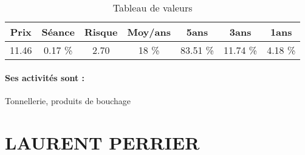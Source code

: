 \documentclass[11pt,a4paper]{report}%
\begin{document}
\begin{table}[H]
  \centering
    \begin{tabular}{|c|c|c|c|c|c|c|}
    \hline
    Prix & Séance & Risque  & Moy/ans & 5ans & 3ans & 1ans \\
    \hline
    11.46 &    0.17 \%    & 2.70 & 18 \% & 83.51 \% & 11.74 \% & 4.18 \% \\
    \hline
    \end{tabular}%
        \label{tab:table_OENEO}%
      \caption{Tableau de valeurs}
\end{table}%

\paragraph{Ses activités sont : } Tonnellerie, produits de bouchage  
    
    \newpage

\section{LAURENT PERRIER}
\end{document}
